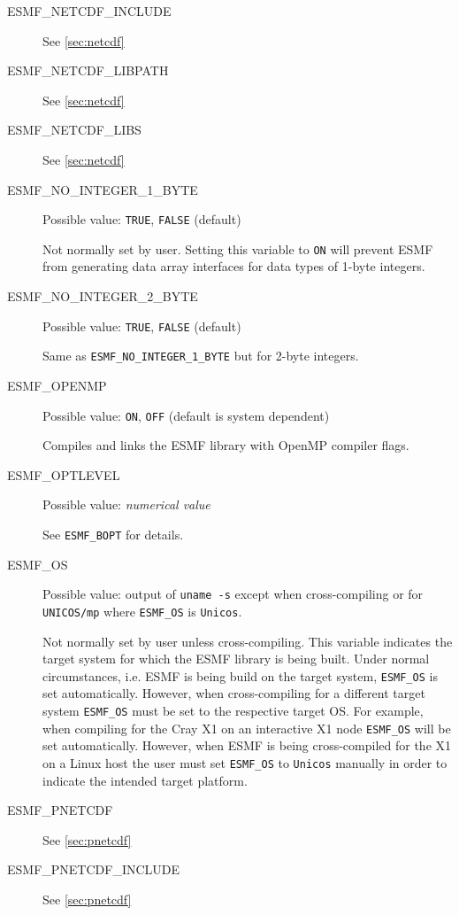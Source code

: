 \begin{description}
\item[ESMF\_NETCDF\_INCLUDE]
See \ref{sec:netcdf}

\item[ESMF\_NETCDF\_LIBPATH]
See \ref{sec:netcdf}

\item[ESMF\_NETCDF\_LIBS]
See \ref{sec:netcdf}

\item[ESMF\_NO\_INTEGER\_1\_BYTE]
Possible value: {\tt TRUE}, {\tt FALSE} (default)

Not normally set by user. Setting this variable to {\tt ON} will prevent ESMF
from generating data array interfaces for data types of 1-byte integers.

\item[ESMF\_NO\_INTEGER\_2\_BYTE] 
Possible value: {\tt TRUE}, {\tt FALSE} (default)

Same as {\tt ESMF\_NO\_INTEGER\_1\_BYTE} but for 2-byte integers.

\item[ESMF\_OPENMP] 
Possible value: {\tt ON}, {\tt OFF} (default is system dependent)

Compiles and links the ESMF library with OpenMP compiler flags.

\item[ESMF\_OPTLEVEL] 
Possible value: {\em numerical value}

See {\tt ESMF\_BOPT} for details.

\item[ESMF\_OS]
Possible value: output of {\tt uname -s} except when cross-compiling or for
{\tt UNICOS/mp} where {\tt ESMF\_OS} is {\tt Unicos}.

Not normally set by user unless cross-compiling. This variable indicates the
target system for which the ESMF library is being built. Under normal
circumstances, i.e. ESMF is being build on the target system, {\tt ESMF\_OS} is
set automatically. However, when cross-compiling for a different target system
{\tt ESMF\_OS} must be set to the respective target OS. For example, when
compiling for the Cray X1 on an interactive X1 node {\tt ESMF\_OS} will be set
automatically. However, when ESMF is being cross-compiled for the X1 on a Linux
host the user must set {\tt ESMF\_OS} to {\tt Unicos} manually in order to
indicate the intended target platform.

\item[ESMF\_PNETCDF]
See \ref{sec:pnetcdf}

\item[ESMF\_PNETCDF\_INCLUDE]
See \ref{sec:pnetcdf}


\end{description}
